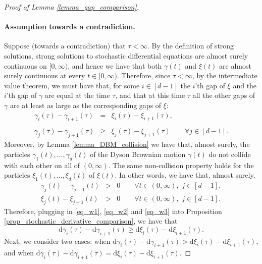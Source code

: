\documentclass[11pt,letterpaper]{article}
\begin{document}
\begin{proof}[Proof of Lemma \ref{lemma_gap_comparison}]
\paragraph{Assumption towards a contradiction.} Suppose (towards a contradiction) that $\tau < \infty$.
%
By the definition of strong solutions, strong solutions to stochastic differential equations are almost surely continuous on $[0,\infty)$, and hence we have that both $\gamma(t)$ and $\xi(t)$ are almost surely continuous at every $t \in [0,\infty)$.
%
Therefore, since $\tau< \infty$, by the intermediate value theorem, we must have that, for some $i\in [d-1]$ the $i$'th gap of $\xi$ and the $i$'th gap of $\gamma$ are equal at the time $\tau$, and that at this time $\tau$ all the other gaps of $\gamma$ are  at least as large as the corresponding gaps of $\xi$:
%
\begin{eqnarray}
      \gamma_i(\tau) - \gamma_{i+1}(\tau) &=& \xi_i(\tau) - \xi_{i+1}(\tau),\label{eq_w1}\\ 
%
\nonumber\\
%
      \gamma_j(\tau) - \gamma_{j+1}(\tau) &\geq  & \xi_j(\tau) - \xi_{j+1}(\tau) \qquad \forall j \in[d-1]. \label{eq_w2} 
\end{eqnarray}
%
Moreover, by Lemma \ref{lemma_DBM_collision} we have that, almost surely, the particles $\gamma_1(t), \ldots, \gamma_d(t)$ of the Dyson Brownian motion $\gamma(t)$ do not collide with each other on all of $(0,\infty)$.
%
The same non-collision property holds for the particles $\xi_1(t), \ldots, \xi_d(t)$ of $\xi(t)$.
%
In other words, we have that, almost surely, 
%
%
\begin{eqnarray} \label{eq_w3}
\gamma_j(t) - \gamma_{j+1}(t) &>&0 \qquad \forall t \in (0,\infty), \,\, j \in [d-1], \nonumber\\
%
\xi_j(t) - \xi_{j+1}(t) &>& 0 \qquad \forall t \in (0,\infty), \,\, j \in [d-1].
\end{eqnarray}
%
Therefore, plugging in \eqref{eq_w1}, \eqref{eq_w2} and \eqref{eq_w3} into Proposition \ref{prop_stochastic_derivative_comparison}, we have that
%
\begin{equation}  \label{eq_w4}
\mathrm{d} \gamma_i(\tau) - \mathrm{d}  \gamma_{i+1}(\tau) \geq \mathrm{d} \xi_i(\tau) - \mathrm{d}  \xi_{i+1}(\tau).
\end{equation}
%
Next, we consider two cases: when $\mathrm{d} \gamma_i(\tau) - \mathrm{d}  \gamma_{i+1}(\tau) > \mathrm{d} \xi_i(\tau) - \mathrm{d}  \xi_{i+1}(\tau)$, and when $\mathrm{d} \gamma_i(\tau) - \mathrm{d}  \gamma_{i+1}(\tau) = \mathrm{d} \xi_i(\tau) - \mathrm{d}  \xi_{i+1}(\tau)$.


\end{proof}
\end{document}
